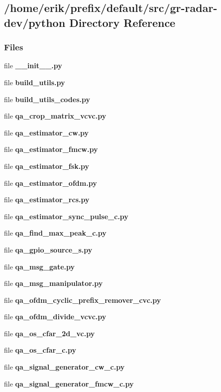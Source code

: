 \subsection{/home/erik/prefix/default/src/gr-\/radar-\/dev/python Directory Reference}
\label{dir_82f46894879600a3b313b719cfb928c5}
\subsubsection*{Files}
\begin{DoxyCompactItemize}
\item 
file {\bf \+\_\+\+\_\+init\+\_\+\+\_\+.\+py}
\item 
file {\bf build\+\_\+utils.\+py}
\item 
file {\bf build\+\_\+utils\+\_\+codes.\+py}
\item 
file {\bf qa\+\_\+crop\+\_\+matrix\+\_\+vcvc.\+py}
\item 
file {\bf qa\+\_\+estimator\+\_\+cw.\+py}
\item 
file {\bf qa\+\_\+estimator\+\_\+fmcw.\+py}
\item 
file {\bf qa\+\_\+estimator\+\_\+fsk.\+py}
\item 
file {\bf qa\+\_\+estimator\+\_\+ofdm.\+py}
\item 
file {\bf qa\+\_\+estimator\+\_\+rcs.\+py}
\item 
file {\bf qa\+\_\+estimator\+\_\+sync\+\_\+pulse\+\_\+c.\+py}
\item 
file {\bf qa\+\_\+find\+\_\+max\+\_\+peak\+\_\+c.\+py}
\item 
file {\bf qa\+\_\+gpio\+\_\+source\+\_\+s.\+py}
\item 
file {\bf qa\+\_\+msg\+\_\+gate.\+py}
\item 
file {\bf qa\+\_\+msg\+\_\+manipulator.\+py}
\item 
file {\bf qa\+\_\+ofdm\+\_\+cyclic\+\_\+prefix\+\_\+remover\+\_\+cvc.\+py}
\item 
file {\bf qa\+\_\+ofdm\+\_\+divide\+\_\+vcvc.\+py}
\item 
file {\bf qa\+\_\+os\+\_\+cfar\+\_\+2d\+\_\+vc.\+py}
\item 
file {\bf qa\+\_\+os\+\_\+cfar\+\_\+c.\+py}
\item 
file {\bf qa\+\_\+signal\+\_\+generator\+\_\+cw\+\_\+c.\+py}
\item 
file {\bf qa\+\_\+signal\+\_\+generator\+\_\+fmcw\+\_\+c.\+py}

\end{DoxyCompactItemize}

